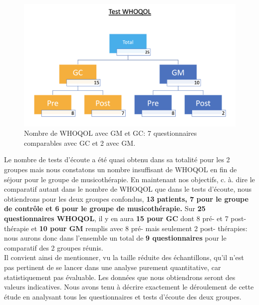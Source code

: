 \begin{figure}
	\centering
	\includegraphics[width=0.7\linewidth]{images/graphiques/TestWQ.png}
	\caption{Nombre de WHOQOL avec GM et GC: 7 questionnaires comparables avec GC et 2 
	avec GM.}
\end{figure}

     
     Le nombre de tests d'écoute a été quasi obtenu dans sa totalité pour les 2 groupes mais 
     nous constatons un nombre insuffisant  de WHOQOL en fin de 
     séjour pour le groupe de musicothérapie.
     En maintenant nos objectifs, c. à. dire  le comparatif autant  dans le nombre de WHOQOL que dans le  
     tests 
      d'écoute, 
     nous obtiendrons pour  les deux groupes confondus, \textbf{13 patients, 7 pour le groupe de contrôle 
     et 
     	6 pour 
     	le groupe de musicothérapie.}
     Sur \textbf{25 questionnaires WHOQOL}, il y en aura  \textbf{15 pour GC} dont 8 pré-
     et 7 post-thérapie et  \textbf{10 pour GM} remplis
     avec 8  pré- mais seulement 2
     post- thérapies:  nous aurons donc dans l'ensemble un total de \textbf{9 questionnaires} pour le
     comparatif des 2 groupes réunis.
   \\
  Il convient ainsi de mentionner, vu la taille réduite des échantillons, qu'il n'est pas
   pertinent de se lancer dans une analyse purement
   quantitative, car  statistiquement pas évaluable. 
   Les données que nous obtiendrons seront des valeurs indicatives.
   Nous avons tenu à décrire exactement le déroulement de cette étude en analysant 
   tous les questionnaires et tests d'écoute des deux groupes.
   
